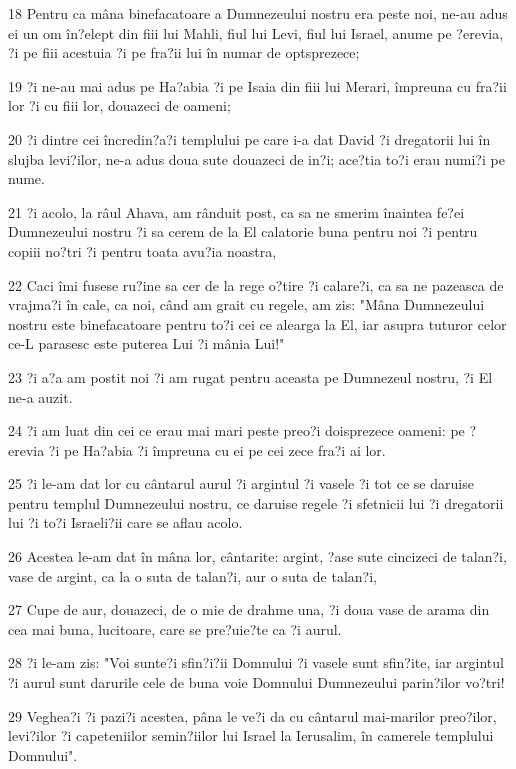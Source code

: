 \par 18 Pentru ca mâna binefacatoare a Dumnezeului nostru era peste noi, ne-au adus ei un om în?elept din fiii lui Mahli, fiul lui Levi, fiul lui Israel, anume pe ?erevia, ?i pe fiii acestuia ?i pe fra?ii lui în numar de optsprezece;
\par 19 ?i ne-au mai adus pe Ha?abia ?i pe Isaia din fiii lui Merari, împreuna cu fra?ii lor ?i cu fiii lor, douazeci de oameni;
\par 20 ?i dintre cei încredin?a?i templului pe care i-a dat David ?i dregatorii lui în slujba levi?ilor, ne-a adus doua sute douazeci de in?i; ace?tia to?i erau numi?i pe nume.
\par 21 ?i acolo, la râul Ahava, am rânduit post, ca sa ne smerim înaintea fe?ei Dumnezeului nostru ?i sa cerem de la El calatorie buna pentru noi ?i pentru copiii no?tri ?i pentru toata avu?ia noastra,
\par 22 Caci îmi fusese ru?ine sa cer de la rege o?tire ?i calare?i, ca sa ne pazeasca de vrajma?i în cale, ca noi, când am grait cu regele, am zis: "Mâna Dumnezeului nostru este binefacatoare pentru to?i cei ce alearga la El, iar asupra tuturor celor ce-L parasesc este puterea Lui ?i mânia Lui!"
\par 23 ?i a?a am postit noi ?i am rugat pentru aceasta pe Dumnezeul nostru, ?i El ne-a auzit.
\par 24 ?i am luat din cei ce erau mai mari peste preo?i doisprezece oameni: pe ?erevia ?i pe Ha?abia ?i împreuna cu ei pe cei zece fra?i ai lor.
\par 25 ?i le-am dat lor cu cântarul aurul ?i argintul ?i vasele ?i tot ce se daruise pentru templul Dumnezeului nostru, ce daruise regele ?i sfetnicii lui ?i dregatorii lui ?i to?i Israeli?ii care se aflau acolo.
\par 26 Acestea le-am dat în mâna lor, cântarite: argint, ?ase sute cincizeci de talan?i, vase de argint, ca la o suta de talan?i, aur o suta de talan?i,
\par 27 Cupe de aur, douazeci, de o mie de drahme una, ?i doua vase de arama din cea mai buna, lucitoare, care se pre?uie?te ca ?i aurul.
\par 28 ?i le-am zis: "Voi sunte?i sfin?i?ii Domnului ?i vasele sunt sfin?ite, iar argintul ?i aurul sunt darurile cele de buna voie Domnului Dumnezeului parin?ilor vo?tri!
\par 29 Veghea?i ?i pazi?i acestea, pâna le ve?i da cu cântarul mai-marilor preo?ilor, levi?ilor ?i capeteniilor semin?iilor lui Israel la Ierusalim, în camerele templului Domnului".
